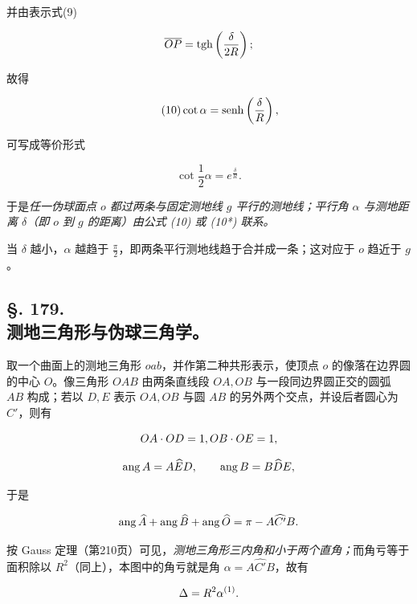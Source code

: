 并由表示式(9)

\[
 \overline{OP}=\operatorname{tgh}\left(\frac{\delta}{2R}\right);
\]

故得

\[
\tag{10}
 \cot\alpha=\operatorname{senh}\left(\frac{\delta}{R}\right),
\]

可写成等价形式

\[
\tag{10*}
 \cot\frac{1}{2}\alpha=e^{\frac{\delta}{R}}.
\]

于是\emph{任一伪球面点 $o$ 都过两条与固定测地线 $g$ 平行的测地线；平行角 $\alpha$ 与测地距离 $\delta$（即 $o$ 到 $g$ 的距离）由公式 (10) 或 (10*) 联系。}



当 $\delta$ 越小，$\alpha$ 越趋于 $\frac{\pi}{2}$，即两条平行测地线趋于合并成一条；这对应于 $o$ 趋近于 $g$。



\subsection*{§. 179.\\ 测地三角形与伪球三角学。}



取一个曲面上的测地三角形 \(oab\)，并作第二种共形表示，使顶点 \(o\) 的像落在边界圆的中心 \(O\)。像三角形 \(OAB\) 由两条直线段 \(OA,OB\) 与一段同边界圆正交的圆弧 \(AB\) 构成；若以 \(D,E\) 表示 \(OA,OB\) 与圆 \(AB\) 的另外两个交点，并设后者圆心为 \(C'\)，则有

\[
 OA\cdot OD=1,\\ OB\cdot OE=1,
\]

\[
 \operatorname{ang} A=A\widehat ED,
 \qquad \operatorname{ang} B=B\widehat DE,
\]

于是

\[
 \operatorname{ang}\widehat A+\operatorname{ang}\widehat B+\operatorname{ang}\widehat O=\pi-A\widehat{C'}B.
\]



\figeight



按 Gauss 定理（第210页）可见，\emph{测地三角形三内角和小于两个直角；}而角亏等于面积除以 $R^2$（同上），本图中的角亏就是角 \(\alpha=A\widehat{C'}B\)，故有

\[
 \Delta=R^2\alpha\srcfnmark{1}.
\]




